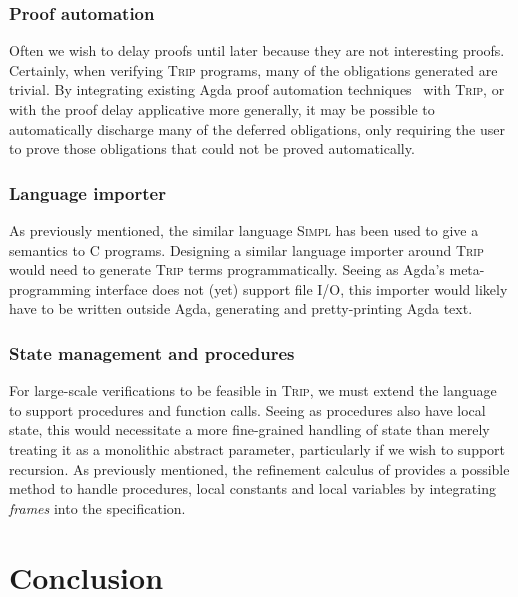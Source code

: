 \documentclass[sigplan]{acmart}%
\begin{document}
\subsubsection{Proof automation}

Often we wish to delay proofs until later because they are not interesting proofs.
Certainly, when verifying \textsc{Trip} programs, many of the obligations 
generated are trivial. By integrating existing Agda proof automation techniques~\citep{agdaauto1,ringsolver,agdaauto3} 
with \textsc{Trip}, or with the proof delay applicative more generally, it may be 
possible to automatically discharge many of the deferred obligations, only 
requiring the user to prove those obligations that could not be proved automatically.

\subsubsection{Language importer}

As previously mentioned, the similar language \textsc{Simpl} has been used to 
give a semantics to C programs. Designing a similar language importer around 
\textsc{Trip} would need to generate \textsc{Trip} terms programmatically. Seeing 
as Agda's meta-programming interface does not (yet) support file I/O, this importer would 
likely have to be written outside Agda, generating and pretty-printing Agda text.

\subsubsection{State management and procedures}

For large-scale verifications to be feasible in \textsc{Trip}, we must extend 
the language to support procedures and function calls. Seeing as procedures 
also have local state, this would necessitate a more fine-grained handling of 
state than merely treating it as a monolithic abstract parameter, particularly 
if we wish to support recursion. As previously mentioned, the refinement 
calculus of \citet{Morgan} provides a possible method to handle procedures, 
local constants and local variables by integrating \emph{frames} into the
specification.


\section{Conclusion}\label{sec:conc}
\end{document}
